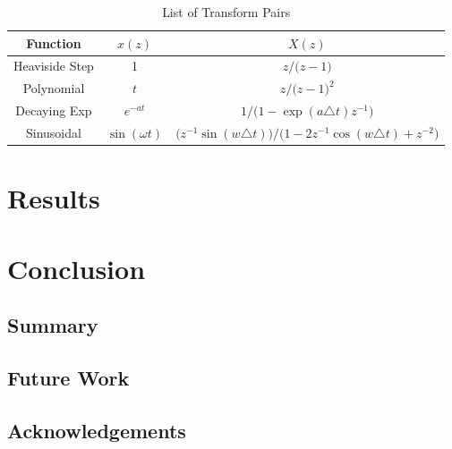 \documentclass[a4paper]{report}
\begin{document}
\begin{table}[h]
    \centering
    \begin{tabular}{c|cc}
    \hline
    \textbf{Function} & $x(z)$ & $X(z)$ \\
    \hline
    Heaviside Step & 1 & $z / \textbf{(}z-1\textbf{)}$ \\
    Polynomial & \(t\) & $z / \textbf{(}z-1\textbf{)}^2 $ \\
    Decaying Exp & $e^{-at}$ & $1 / \textbf{(}1 - \exp(a\triangle t) z^{-1}\textbf{)}$ \\
    Sinusoidal & $\sin(\omega t)$ & $\textbf{(}z^{-1}\sin(w\triangle t)\textbf{)} / \textbf{(}1-2z^{-1}\cos(w\triangle t) + z^{-2}\textbf{)}$
    \end{tabular}
    \caption{List of Transform Pairs}
    \label{tab:transform_pairs}
\end{table}

\chapter{Results}

\chapter{Conclusion}
\section{Summary}

\section{Future Work}

\section{Acknowledgements}





\begin{appendices}

% 
    
\end{appendices}
\end{document}
